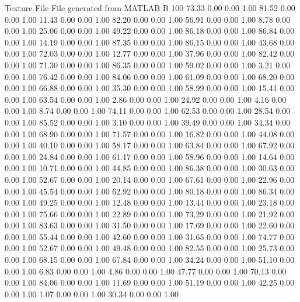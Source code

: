Texture File
File generated from MATLAB
B 100
   73.33   0.00   0.00   1.00
   81.52   0.00   0.00   1.00
   11.43   0.00   0.00   1.00
   82.20   0.00   0.00   1.00
   56.91   0.00   0.00   1.00
    8.78   0.00   0.00   1.00
   25.06   0.00   0.00   1.00
   49.22   0.00   0.00   1.00
   86.18   0.00   0.00   1.00
   86.84   0.00   0.00   1.00
   14.19   0.00   0.00   1.00
   87.35   0.00   0.00   1.00
   86.15   0.00   0.00   1.00
   43.68   0.00   0.00   1.00
   72.03   0.00   0.00   1.00
   12.77   0.00   0.00   1.00
   37.96   0.00   0.00   1.00
   82.42   0.00   0.00   1.00
   71.30   0.00   0.00   1.00
   86.35   0.00   0.00   1.00
   59.02   0.00   0.00   1.00
    3.21   0.00   0.00   1.00
   76.42   0.00   0.00   1.00
   84.06   0.00   0.00   1.00
   61.09   0.00   0.00   1.00
   68.20   0.00   0.00   1.00
   66.88   0.00   0.00   1.00
   35.30   0.00   0.00   1.00
   58.99   0.00   0.00   1.00
   15.41   0.00   0.00   1.00
   63.54   0.00   0.00   1.00
    2.86   0.00   0.00   1.00
   24.92   0.00   0.00   1.00
    4.16   0.00   0.00   1.00
    8.74   0.00   0.00   1.00
   74.11   0.00   0.00   1.00
   62.53   0.00   0.00   1.00
   28.54   0.00   0.00   1.00
   85.52   0.00   0.00   1.00
    3.10   0.00   0.00   1.00
   39.49   0.00   0.00   1.00
   34.34   0.00   0.00   1.00
   68.90   0.00   0.00   1.00
   71.57   0.00   0.00   1.00
   16.82   0.00   0.00   1.00
   44.08   0.00   0.00   1.00
   40.10   0.00   0.00   1.00
   58.17   0.00   0.00   1.00
   63.84   0.00   0.00   1.00
   67.92   0.00   0.00   1.00
   24.84   0.00   0.00   1.00
   61.17   0.00   0.00   1.00
   58.96   0.00   0.00   1.00
   14.64   0.00   0.00   1.00
   10.71   0.00   0.00   1.00
   44.85   0.00   0.00   1.00
   86.38   0.00   0.00   1.00
   30.63   0.00   0.00   1.00
   52.67   0.00   0.00   1.00
   20.14   0.00   0.00   1.00
   67.61   0.00   0.00   1.00
   22.96   0.00   0.00   1.00
   45.54   0.00   0.00   1.00
   62.92   0.00   0.00   1.00
   80.18   0.00   0.00   1.00
   86.34   0.00   0.00   1.00
   49.25   0.00   0.00   1.00
   12.48   0.00   0.00   1.00
   13.44   0.00   0.00   1.00
   23.18   0.00   0.00   1.00
   75.66   0.00   0.00   1.00
   22.89   0.00   0.00   1.00
   73.29   0.00   0.00   1.00
   21.92   0.00   0.00   1.00
   83.63   0.00   0.00   1.00
   31.50   0.00   0.00   1.00
   17.69   0.00   0.00   1.00
   22.60   0.00   0.00   1.00
   55.44   0.00   0.00   1.00
   42.60   0.00   0.00   1.00
   31.65   0.00   0.00   1.00
   74.77   0.00   0.00   1.00
   52.67   0.00   0.00   1.00
   49.48   0.00   0.00   1.00
   82.55   0.00   0.00   1.00
   25.73   0.00   0.00   1.00
   68.15   0.00   0.00   1.00
   67.84   0.00   0.00   1.00
   34.24   0.00   0.00   1.00
   51.10   0.00   0.00   1.00
    6.83   0.00   0.00   1.00
    4.86   0.00   0.00   1.00
   47.77   0.00   0.00   1.00
   70.13   0.00   0.00   1.00
   84.06   0.00   0.00   1.00
   11.69   0.00   0.00   1.00
   51.19   0.00   0.00   1.00
   42.25   0.00   0.00   1.00
    1.07   0.00   0.00   1.00
   30.34   0.00   0.00   1.00
